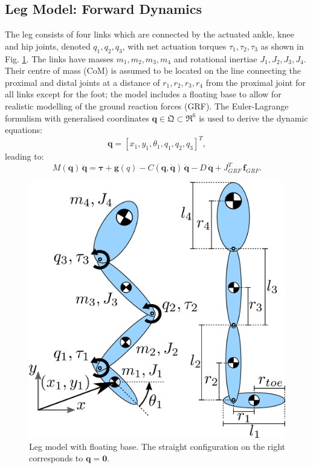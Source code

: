 \documentclass[letterpaper, 10 pt, conference]{ieeeconf}  %
\begin{document}
\subsection{Leg Model: Forward Dynamics} 
The leg consists of four links which are connected by the actuated ankle, knee and hip joints, denoted $q_1,q_2,q_3$, with net actuation torques $\tau_1,\tau_2,\tau_3$ as shown in Fig. \ref{fig:Leg_3DoF_model}. The links have masses $m_1,m_2,m_3,m_4$ and rotational inertiae $J_1,J_2,J_3,J_4$. Their centre of mass (CoM) is assumed to be located on the line connecting the proximal and distal joints at a distance of $r_1,r_2,r_3,r_4$ from the proximal joint for all links except for the foot; the model includes a floating base to allow for realistic modelling of the ground reaction forces (GRF). %
The Euler-Lagrange formulism with generalised coordinates $\mathbf{q} \in \mathfrak{Q} \subset \mathfrak{R}^{6}$ is used to derive the dynamic equations:
\begin{equation}
	\mathbf{q} = [x_1,y_1,\theta_1,q_1,q_2,q_3]^T,
	\label{eq:q}
\end{equation}
leading to:
\begin{equation}
	M(\mathbf{q}) \, \mathbf{\ddot q} = \mathbf{\boldsymbol{\tau}} + \mathbf{g}(q) - C(\mathbf{q, \dot q}) \, \mathbf{\dot q} - D \, \mathbf{\dot q} + J_{GRF}^T \, \mathbf{f}_{GRF}.
\label{eq:fwddyn}
\end{equation}

\begin{figure}[ht]
	\centering
	\includegraphics[width=0.6\linewidth]{Leg_3DoF_model}
	\caption{Leg model with floating base. The straight configuration on
		the right corresponds to $\mathbf{q} = \mathbf{0}$.}
	\label{fig:Leg_3DoF_model}
\end{figure}
\end{document}
